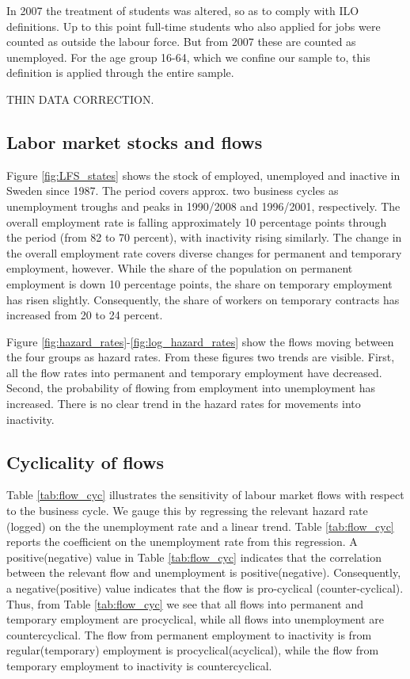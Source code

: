 In 2007 the treatment of students was altered, so as to comply with ILO definitions. Up to this point full-time students who also applied for jobs were counted as outside the labour force. But from 2007 these are counted as unemployed. For the age group 16-64, which we confine our sample to, this definition is applied through the entire sample. 

THIN DATA CORRECTION.

\subsection{Labor market stocks and flows}
Figure \ref{fig:LFS_states} shows the stock of employed, unemployed and inactive in Sweden since 1987. The period covers approx. two business cycles as unemployment troughs and peaks in 1990/2008 and 1996/2001, respectively. The overall employment rate is falling approximately 10 percentage points through the period (from 82 to 70 percent), with inactivity rising similarly. The change in the overall employment rate covers diverse changes for permanent and temporary employment, however. While the share of the population on permanent employment is down 10 percentage points, the share on temporary employment has risen slightly. Consequently, the share of workers on temporary contracts has increased from 20 to 24 percent.

Figure \ref{fig:hazard_rates}-\ref{fig:log_hazard_rates} show the flows moving between the four groups as hazard rates. From these figures two trends are visible. First, all the flow rates into permanent and temporary employment have decreased. Second, the probability of flowing from employment into unemployment has increased. There is no clear trend in the hazard rates for movements into inactivity. 

\subsection{Cyclicality of flows}

Table \ref{tab:flow_cyc} illustrates the sensitivity of labour market flows with respect to the business cycle. We gauge this by regressing the relevant hazard rate (logged) on the the unemployment rate and a linear trend. Table \ref{tab:flow_cyc} reports the coefficient on the unemployment rate from this regression. A positive(negative) value in Table \ref{tab:flow_cyc} indicates that the correlation between the relevant flow and unemployment is positive(negative). Consequently, a negative(positive) value indicates that the flow is pro-cyclical (counter-cyclical). Thus, from Table \ref{tab:flow_cyc} we see that all flows into permanent and temporary employment are procyclical, while all flows into unemployment are countercyclical. The flow from permanent employment to inactivity is from regular(temporary) employment is procyclical(acyclical), while the flow from temporary employment to inactivity is countercyclical. 

